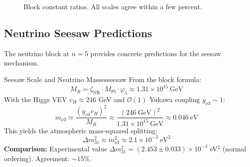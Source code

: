 \begin{figure}[H]
\centering
{}
\caption{Block constant ratios. All scales agree within a few percent.}
\label{fig:blocks}
\end{figure}

\subsection{Neutrino Seesaw Predictions}

The neutrino block at $n = 5$ provides concrete predictions for the seesaw mechanism.

\begin{corollary}{Seesaw Scale and Neutrino Masses}{seesaw}
From the block formula:
\begin{equation}
    M_R = \zeta_{\text{NR}} \cdot M_{\mathrm{Pl}} \cdot \varphi_5 
    \approx 1.31 \times 10^{15}~\text{GeV}
\end{equation}
With the Higgs VEV $v_H \approx 246$ GeV and $\mathcal{O}(1)$ Yukawa coupling $y_{\nu 3} \sim 1$:
\begin{equation}
    m_{\nu 3} \simeq \frac{(y_{\nu 3} v_H)^2}{M_R} 
    \approx \frac{(246~\text{GeV})^2}{1.31 \times 10^{15}~\text{GeV}} 
    \approx 0.046~\text{eV}
\end{equation}
This yields the atmospheric mass-squared splitting:
\begin{equation}
    \Delta m^2_{31} \approx m_{\nu 3}^2 \approx 2.1 \times 10^{-3}~\text{eV}^2
\end{equation}
\textbf{Comparison:} Experimental value $\Delta m^2_{31} = (2.453 \pm 0.033) \times 10^{-3}$ eV$^2$ 
(normal ordering). Agreement: $\sim 15\%$.
\end{corollary}

